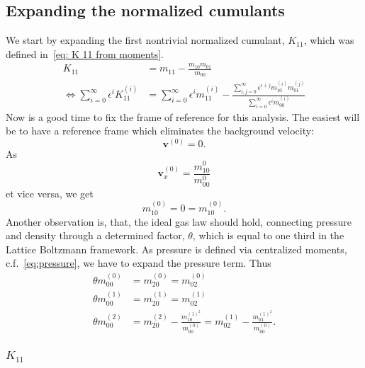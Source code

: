 \subsection{Expanding the normalized cumulants}
\label{sub:Expanding the normalized cumulants}
We start by expanding the first nontrivial normalized cumulant, $K_{11}$, which was defined in~\eqref{eq: K 11 from moments}.
\begin{equation}
  \begin{aligned}
    K_{11} & = m_{11} - \frac{m_{10}m_{01}}{m_{00}}\\
    \Leftrightarrow
    \sum_{i=0}^\infty \epsilon^i K_{11}^{(i)}
    & = \sum_{i=0}^\infty \epsilon^i m_{11}^{(i)} -
    \frac{\sum_{i,j=0}^\infty \epsilon^{i+j} m_{10}^{(i)}m_{01}^{(j)}}
         {\sum_{i=0}^\infty \epsilon^i m_{00}^{(i)}}
  \end{aligned}
\end{equation}
Now is a good time to fix the frame of reference for this analysis. The easiest will be to have a reference frame which eliminates the background velocity:
\begin{equation}
  \mathbf{v}^{(0)} = 0.
\end{equation}
As
\begin{equation}
  \mathbf{v}_x^{(0)} = \frac{m_{10}^{0}}{m_{00}^{0}}
\end{equation}
et vice versa, we get
\begin{equation}
  \label{eq: frame of reference}
  m_{10}^{(0)} = 0 = m_{10}^{(0)}.
\end{equation}
Another observation is, that, the ideal gas law should hold, connecting pressure and density through a determined factor, $\theta$, which is equal to one third in the Lattice Boltzmann framework. As pressure is defined via centralized moments, c.f.~\eqref{eq:pressure}, we have to expand the pressure term. Thus
\begin{align}
  \label{eq: ideal gas zeroth order}
  \theta m_{00}^{(0)} &= m_{20}^{(0)} = m_{02}^{(0)}
\\
  \label{eq: ideal gas first order}
  \theta m_{00}^{(1)} &= m_{20}^{(1)} = m_{02}^{(1)}
  \\
  \label{eq: ideal gas second order}
  \theta m_{00}^{(2)} &= m_{20}^{(2)} - \frac{m_{10}^{{(1)}^2}}{m_{00}^{(0)}}  = m_{02}^{(1)} - \frac{m_{01}^{{(1)}^2}}{m_{00}^{(0)}}.
\end{align}

\subsubsection{\texorpdfstring{$K_{11}$}{K 11}}
\label{subs:K 11}

